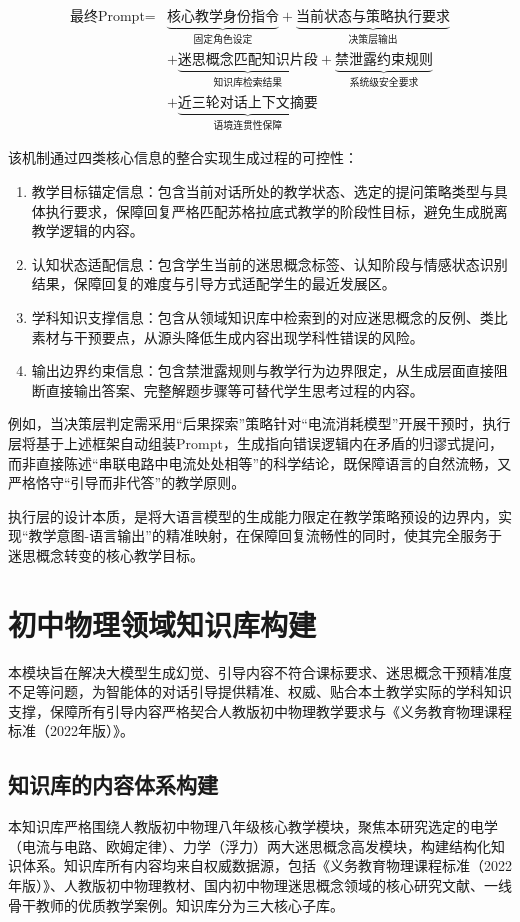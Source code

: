 \[
\begin{split}
\text{最终Prompt} =& \underbrace{\text{核心教学身份指令}}_{\text{固定角色设定}} + \underbrace{\text{当前状态与策略执行要求}}_{\text{决策层输出}} \\
&+ \underbrace{\text{迷思概念匹配知识片段}}_{\text{知识库检索结果}} + \underbrace{\text{禁泄露约束规则}}_{\text{系统级安全要求}} \\
&+ \underbrace{\text{近三轮对话上下文摘要}}_{\text{语境连贯性保障}}
\end{split}
\]

该机制通过四类核心信息的整合实现生成过程的可控性：
\begin{enumerate}
    \item 教学目标锚定信息：包含当前对话所处的教学状态、选定的提问策略类型与具体执行要求，保障回复严格匹配苏格拉底式教学的阶段性目标，避免生成脱离教学逻辑的内容。
    \item 认知状态适配信息：包含学生当前的迷思概念标签、认知阶段与情感状态识别结果，保障回复的难度与引导方式适配学生的最近发展区。
    \item 学科知识支撑信息：包含从领域知识库中检索到的对应迷思概念的反例、类比素材与干预要点，从源头降低生成内容出现学科性错误的风险。
    \item 输出边界约束信息：包含禁泄露规则与教学行为边界限定，从生成层面直接阻断直接输出答案、完整解题步骤等可替代学生思考过程的内容。
\end{enumerate}

例如，当决策层判定需采用“后果探索”策略针对“电流消耗模型”开展干预时，执行层将基于上述框架自动组装Prompt，生成指向错误逻辑内在矛盾的归谬式提问，而非直接陈述“串联电路中电流处处相等”的科学结论，既保障语言的自然流畅，又严格恪守“引导而非代答”的教学原则。

执行层的设计本质，是将大语言模型的生成能力限定在教学策略预设的边界内，实现“教学意图-语言输出”的精准映射，在保障回复流畅性的同时，使其完全服务于迷思概念转变的核心教学目标。

\section{初中物理领域知识库构建}

本模块旨在解决大模型生成幻觉、引导内容不符合课标要求、迷思概念干预精准度不足等问题，为智能体的对话引导提供精准、权威、贴合本土教学实际的学科知识支撑，保障所有引导内容严格契合人教版初中物理教学要求与《义务教育物理课程标准（2022年版）》。

\subsection{知识库的内容体系构建}
本知识库严格围绕人教版初中物理八年级核心教学模块，聚焦本研究选定的电学（电流与电路、欧姆定律）、力学（浮力）两大迷思概念高发模块，构建结构化知识体系。知识库所有内容均来自权威数据源，包括《义务教育物理课程标准（2022年版）》、人教版初中物理教材、国内初中物理迷思概念领域的核心研究文献、一线骨干教师的优质教学案例。知识库分为三大核心子库。

